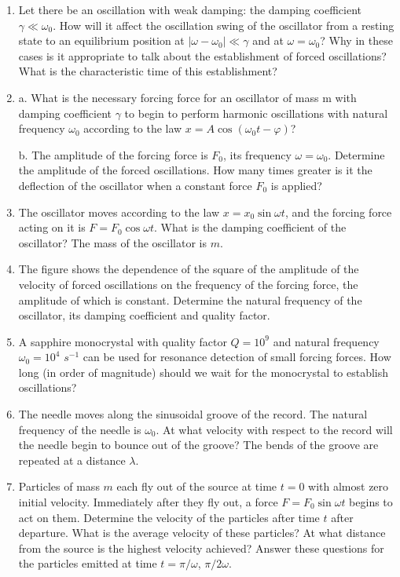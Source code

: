 \documentclass{article}
\begin{document}
\begin{enumerate}[label=3.5.\arabic*]
\item Let there be an oscillation with weak damping: the damping coefficient $\gamma \ll \omega_0$. How will it affect the oscillation swing of the oscillator from a resting state to an equilibrium position at $| \omega - \omega_0 | \ll \gamma$ and at $\omega = \omega_0$? Why in these cases is it appropriate to talk about the establishment of forced oscillations? What is the characteristic time of this establishment?

\item a. What is the necessary forcing force for an oscillator of mass m with damping coefficient $\gamma$ to begin to perform harmonic oscillations with natural frequency $\omega_0$ according to the law $x = A \cos{(\omega_0 t - \varphi)}$?

b. The amplitude of the forcing force is $F_0$, its frequency $\omega = \omega_0$. Determine the amplitude of the forced oscillations. How many times greater is it the deflection of the oscillator when a constant force $F_0$ is applied?

\item The oscillator moves according to the law $x = x_0 \sin{\omega t}$, and the forcing force acting on it is $F = F_0 \cos{\omega t}$. What is the damping coefficient of the oscillator? The mass of the oscillator is $m$.

\item The figure shows the dependence of the square of the amplitude of the velocity of forced oscillations on the frequency of the forcing force, the amplitude of which is constant. Determine the natural frequency of the oscillator, its damping coefficient and quality factor.

\item A sapphire monocrystal with quality factor $Q = 10^9$ and natural frequency $\omega_0 = 10^4$ $s^{-1}$ can be used for resonance detection of small forcing forces. How long (in order of magnitude) should we wait for the monocrystal to establish oscillations?

\item The needle moves along the sinusoidal groove of the record. The natural frequency of the needle is $\omega_0$. At what velocity with respect to the record will the needle begin to bounce out of the groove? The bends of the groove are repeated at a distance $\lambda$.

\item Particles of mass $m$ each fly out of the source at time $t = 0$ with almost zero initial velocity. Immediately after they fly out, a force $F = F_0 \sin{\omega t}$ begins to act on them. Determine the velocity of the particles after time $t$ after departure. What is the average velocity of these particles? At what distance from the source is the highest velocity achieved? Answer these questions for the particles emitted at time $t = \pi/\omega$, $\pi /2 \omega$.


\end{enumerate}
\end{document}
